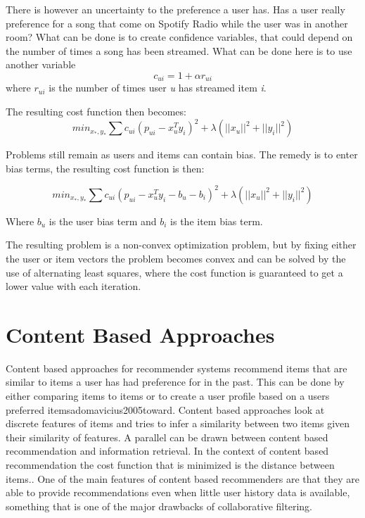 \documentclass[a4paper,11pt]{kth-mag}
\begin{document}
There is however an uncertainty to the preference a user has. Has a user really preference for a song that come on Spotify Radio while the user was in another room? What can be done is to create confidence variables, that could depend on the number of times a song has been streamed. What can be done here is to use another variable \[ c_{ui} = 1 + \alpha r_{ui} \] where $r_{ui}$ is the number of times user \textit{u} has streamed item \textit{i}.

The resulting cost function then becomes:
\begin{equation}
min_{x_*,y_*} \sum c_{ui}(p_{ui} - x_u^Ty_i)^2 +  \lambda(||x_u||^2 + ||y_i||^2)
\end{equation}

Problems still remain as users and items can contain bias. The remedy is to enter bias terms, the resulting cost function is then:

\begin{equation}
min_{x_*,y_*} \sum c_{ui}(p_{ui} - x_u^Ty_i - b_u - b_i)^2 +  \lambda(||x_u||^2 + ||y_i||^2)
\end{equation}

Where $b_u$ is the user bias term and $b_i$ is the item bias term.

The resulting problem is a non-convex optimization problem, but by fixing either the user or item vectors the problem becomes convex and can be solved by the use of alternating least squares, where the cost function is guaranteed to get a lower value with each iteration\cite{hu2008collaborative}.

\section{Content Based Approaches}
Content based approaches for recommender systems recommend items that are similar to items  a user has had preference for in the past. This can be done by either comparing items to items or to create a user profile based on a users preferred items{adomavicius2005toward}. Content based approaches look at discrete features of items and tries to infer a similarity between two items given their similarity of features. A parallel can be drawn between content based recommendation and information retrieval. In the context of content based recommendation the cost function that is minimized is the distance between items.\cite{adomavicius2005toward}. One of the main features of content based recommenders are that they are able to provide recommendations even when little user history data is available, something that is one of the major drawbacks of collaborative filtering\cite{gunawardana2009unified}.
\end{document}
